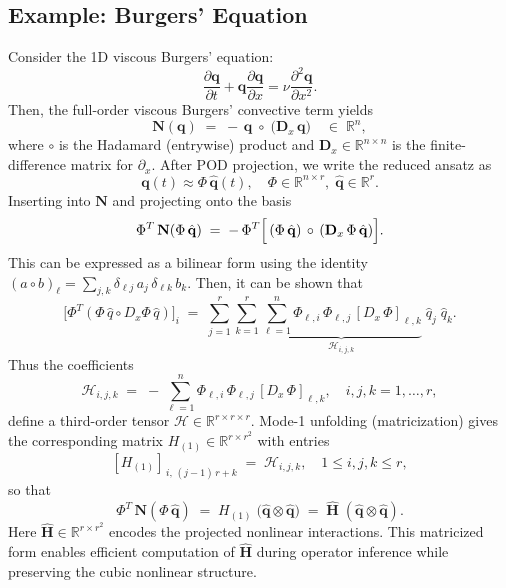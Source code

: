 \subsection*{Example: Burgers' Equation}
Consider the 1D viscous Burgers' equation:\\
$$\frac{\partial \mathbf{q}}{\partial t} + \mathbf{q}\frac{\partial \mathbf{q}}{\partial x} = \nu \frac{\partial^2 \mathbf{q}}{\partial x^2}.$$
Then, the full-order viscous Burgers’ convective term yields\\
$$\mathbf{N}(\mathbf{q}) \;=\; -\,\mathbf{q}\;\circ\;\bigl(\mathbf{D}_x\,\mathbf{q}\bigr)
\quad\in\;\mathbb{R}^n,$$
where $\circ$ is the Hadamard (entrywise) product and $\mathbf{D}_x\in\mathbb{R}^{n\times n}$ is the finite-difference matrix for $\partial_x$. After POD projection, we write the reduced ansatz as\\$$\mathbf{q}(t)\approx \Phi\,\hat{\mathbf{q}}(t),\quad \Phi\in\mathbb{R}^{n\times r},\;\hat{\mathbf{q}}\in\mathbb{R}^r.$$ Inserting into $\mathbf{N}$ and projecting onto the basis\\$$\Phi^T\,\mathbf{N}(\Phi\,\hat{\mathbf{q}})\;=\;
    -\,\Phi^T \Bigl[\,( \Phi\,\hat{\mathbf{q}})\,\circ\,(\mathbf{D}_x\,\Phi\,\hat{\mathbf{q}})\Bigr].$$
This can be expressed as a bilinear form using the identity $\displaystyle (a\circ b)_\ell = \sum_{j,k}\delta_{\ell j}\,a_j\,\delta_{\ell k}\,b_k$. Then, it can be shown that\\$$\bigl[\Phi^T(\Phi\,\hat q\circ D_x\Phi\,\hat q)\bigr]_i
    \;=\;
    \sum_{j=1}^r\sum_{k=1}^r
      \underbrace{\sum_{\ell=1}^n \Phi_{\ell,i}\,\Phi_{\ell,j}\,[D_x\,\Phi]_{\ell,k}}_{\,\mathcal{H}_{i,j,k}\,}
    \;\hat q_j\;\hat q_k.$$
  Thus the coefficients\\
  $$\mathcal{H}_{i,j,k}
    \;=\;
    -\,\sum_{\ell=1}^n \Phi_{\ell,i}\,\Phi_{\ell,j}\,[D_x\,\Phi]_{\ell,k},
    \quad
    i,j,k=1,\dots,r,$$
  define a third-order tensor $\mathcal{H}\in\mathbb{R}^{r\times r\times r}$. Mode-1 unfolding (matricization) gives the corresponding matrix
  $H_{(1)}\in\mathbb{R}^{r\times r^2}$ with entries\\
  $$[H_{(1)}]_{\,i,\,(j-1)\,r + k}
    \;=\;
    \mathcal{H}_{i,j,k},
    \quad
    1\le i,j,k\le r,$$
  so that\\
  $$\Phi^T\,\mathbf{N}(\Phi\,\hat{\mathbf{q}})
    \;=\;
    H_{(1)}\;\bigl(\hat{\mathbf{q}}\otimes\hat{\mathbf{q}}\bigr)
    \;=\;
    \hat{\mathbf{H}}\;(\hat{\mathbf{q}}\otimes\hat{\mathbf{q}}).$$
Here $\hat{\mathbf{H}} \in \mathbb{R}^{r \times r^2}$ encodes the projected nonlinear interactions. This matricized form enables efficient computation of $\hat{\mathbf{H}}$ during operator inference while preserving the cubic nonlinear structure.

